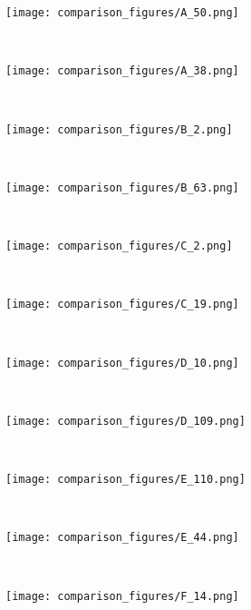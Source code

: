 \documentclass[conference]{IEEEtran}
\begin{document}
\begin{figure*}[!htbp]
\centering
    \begin{subfigure}[b]{0.15\textwidth}
        \texttt{[image: comparison\_figures/A\_50.png]}
    \end{subfigure}
    ~ %
    \begin{subfigure}[b]{0.15\textwidth}
        \texttt{[image: comparison\_figures/A\_38.png]}
    \end{subfigure}
    ~
    \begin{subfigure}[b]{0.15\textwidth}
        \texttt{[image: comparison\_figures/B\_2.png]}
    \end{subfigure}
    ~
    \begin{subfigure}[b]{0.15\textwidth}
        \texttt{[image: comparison\_figures/B\_63.png]}
    \end{subfigure}
    ~
    \begin{subfigure}[b]{0.15\textwidth}
        \texttt{[image: comparison\_figures/C\_2.png]}
    \end{subfigure}
    ~
    \begin{subfigure}[b]{0.15\textwidth}
        \texttt{[image: comparison\_figures/C\_19.png]}
    \end{subfigure}
    ~
    \begin{subfigure}[b]{0.15\textwidth}
        \texttt{[image: comparison\_figures/D\_10.png]}
    \end{subfigure}
    ~
    \begin{subfigure}[b]{0.15\textwidth}
        \texttt{[image: comparison\_figures/D\_109.png]}
    \end{subfigure}
    ~
    \begin{subfigure}[b]{0.15\textwidth}
        \texttt{[image: comparison\_figures/E\_110.png]}
    \end{subfigure}
    ~
    \begin{subfigure}[b]{0.15\textwidth}
        \texttt{[image: comparison\_figures/E\_44.png]}
    \end{subfigure}
    ~
    \begin{subfigure}[b]{0.15\textwidth}
        \texttt{[image: comparison\_figures/F\_14.png]}
    \end{subfigure}
    ~
    \begin{subfigure}[b]{0.15\textwidth}

\end{subfigure}
\end{figure*}
\end{document}
